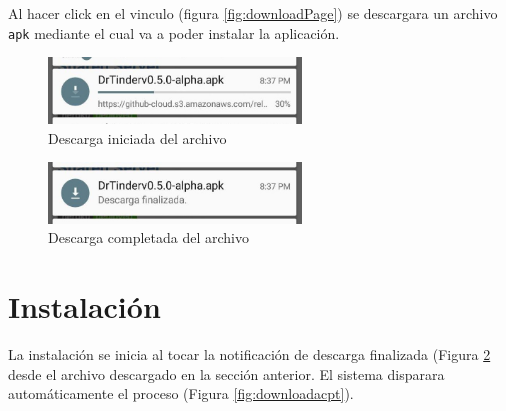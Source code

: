 \documentclass[10pt,letterpaper,extrafontsizes]{memoir}
\begin{document}
Al hacer click en el vinculo (figura \ref{fig:downloadPage}) se descargara un archivo \texttt{apk} mediante el cual va a poder instalar la aplicación.

\begin{figure}[H]
    \centering
\includegraphics[width=0.6\textwidth]{graficos/capturas/d}
    \caption{Descarga iniciada del archivo}
    \label{fig:downloaddiag2}
\end{figure}

\begin{figure}[H]
    \centering
\includegraphics[width=0.6\textwidth]{graficos/capturas/e}
    \caption{Descarga completada del archivo}
    \label{fig:downloaddone}
\end{figure}

\section{Instalación}

La instalación se inicia al tocar la notificación de descarga finalizada (Figura \ref{fig:downloaddone} desde el archivo descargado en la sección anterior. El sistema disparara automáticamente el proceso (Figura \ref{fig:downloadacpt}).
\end{document}
